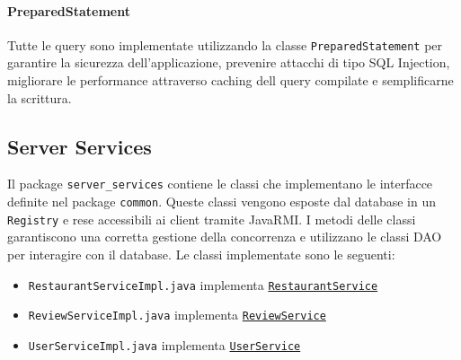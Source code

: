 \paragraph{PreparedStatement}
Tutte le query sono implementate utilizzando la classe
\texttt{PreparedStatement} per garantire la sicurezza
dell'applicazione, prevenire attacchi di tipo SQL Injection, 
migliorare le performance attraverso caching dell query compilate
e semplificarne la scrittura.

\subsection{Server Services}
Il package \texttt{server\_services} contiene le classi che implementano
le interfacce definite nel package \texttt{common}.
Queste classi vengono esposte dal database in un \texttt{Registry}
e rese accessibili ai client tramite JavaRMI.
I metodi delle classi garantiscono una corretta gestione della 
concorrenza e utilizzano le classi DAO per interagire con il database.
Le classi implementate sono le seguenti:
\begin{itemize}
    \item \texttt{RestaurantServiceImpl.java} implementa \texttt{\hyperref[sec:restaurantservice]{RestaurantService}}
    \item \texttt{ReviewServiceImpl.java} implementa \texttt{\hyperref[sec:reviewservice]{ReviewService}}
    \item \texttt{UserServiceImpl.java} implementa \texttt{\hyperref[sec:userservice]{UserService}}
\end{itemize}
